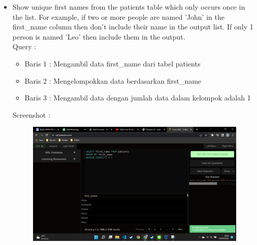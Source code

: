 \documentclass[]{article}
\begin{document}
\begin{itemize}
        \item Show unique first names from the patients table which only occurs once in the list. For example, if two or more people are named 'John' in the first\_name column then don't include their name in the output list. If only 1 person is named 'Leo' then include them in the output.
        \\Query :
        
        \begin{itemize}
            \item Baris 1 : Mengambil data first\_name dari tabel patients
            \item Baris 2 : Mengelompokkan data berdasarkan first\_name
            \item Baris 3 : Mengambil data dengan jumlah data dalam kelompok adalah 1
        \end{itemize}
        \pagebreak
        Screenshot :
        \begin{figure}[h]
            \includegraphics[scale=0.3]{./Screenshot/Medium-2.png}
            \centering
        \end{figure}


\end{itemize}
\end{document}
